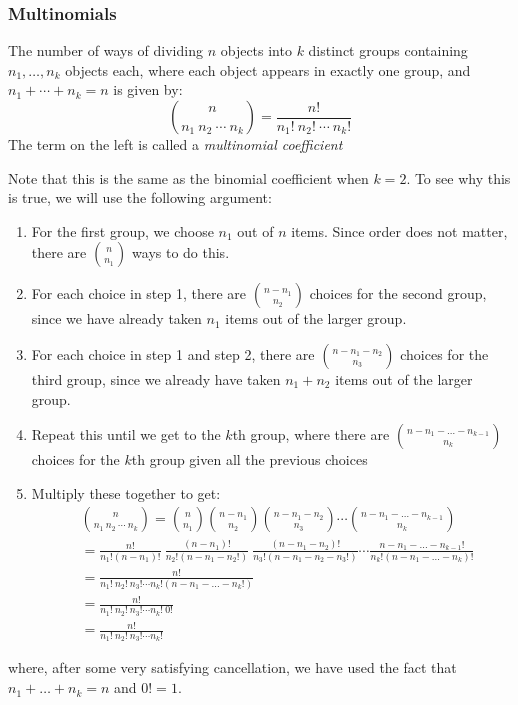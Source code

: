 \documentclass[12pt]{article}
\theoremstyle{definition}
\theoremstyle{remark}
\begin{document}
\subsubsection{Multinomials}
\begin{framed}
The number of ways of dividing $n$ objects into $k$ distinct groups containing $n_1, \dots, n_k$ objects each, where each object appears in exactly one group, and $n_1 + \cdots + n_k = n$ is given by:
\[
\binom{n}{n_1 \: n_2\: \cdots \:n_k} = \frac{n!}{n_1!\:n_2!\:\cdots\:n_k!}
\]
The term on the left is called a \emph{multinomial coefficient}
\end{framed}
Note that this is the same as the binomial coefficient when $k = 2$. To see why this is true, we will use the following argument:
\begin{enumerate}
\item For the first group, we choose $n_1$ out of $n$ items. Since order does not matter, there are $\binom{n}{n_1}$ ways to do this.
\item For each choice in step 1, there are $\binom{n - n_1}{n_2}$ choices for the second group, since we have already taken $n_1$ items out of the larger group.
\item For each choice in step 1 and step 2, there are $\binom{n - n_1 - n_2}{n_3}$ choices for the third group, since we already have taken $n_1 + n_2$ items out of the larger group.
\item Repeat this until we get to the $k$th group, where there are $\binom{n - n_1 - \dots - n_{k-1}}{n_k}$ choices for the $k$th group given all the previous choices
\item Multiply these together to get:
\begin{align*}
&\binom{n}{n_1 \: n_2\: \cdots \:n_k} = \binom{n}{n_1} \binom{n - n_1}{n_2} \binom{n - n_1 - n_2}{n_3} \cdots \binom{n - n_1 - \dots - n_{k-1}}{n_k} \\
&= \frac{n!}{n_1! (n - n_1)!}\:\frac{(n - n_1)!}{n_2!(n - n_1 - n_2!)}\:\frac{(n - n_1 - n_2)!}{n_3!(n - n_1 - n_2 - n_3!)}\cdots\frac{n - n_1 - \dots - n_{k-1}!}{n_k! (n - n_1 - \dots - n_k)!}\\
&= \frac{n!}{n_1! \: n_2! \: n_3! \cdots n_k! (n - n_1 - \dots - n_k! )} \\
&= \frac{n!}{n_1! \: n_2! \: n_3! \cdots n_k! \: 0! } \\
&= \frac{n!}{n_1! \: n_2! \: n_3! \cdots n_k! }
\end{align*}
\end{enumerate}
where, after some very satisfying cancellation, we have used the fact that $n_1 + \dots + n_k = n$ and $0! = 1$.\\
\end{document}
